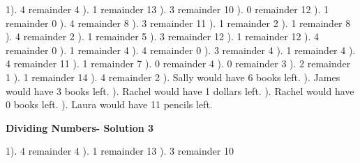 \documentclass{article}%
\begin{document}
1). 4 remainder 4%
). 1 remainder 13%
). 3 remainder 10%
). 0 remainder 12%
). 1 remainder 0%
). 4 remainder 8%
). 3 remainder 11%
). 1 remainder 2%
). 1 remainder 8%
). 4 remainder 2%
). 1 remainder 5%
). 3 remainder 12%
). 1 remainder 12%
). 4 remainder 0%
). 1 remainder 4%
). 4 remainder 0%
). 3 remainder 4%
). 1 remainder 4%
). 4 remainder 11%
). 1 remainder 7%
). 0 remainder 4%
). 0 remainder 3%
). 2 remainder 1%
). 1 remainder 14%
). 4 remainder 2%
). Sally would have 6 books left.%
). James would have 3 books left.%
). Rachel would have 1 dollars left.%
). Rachel would have 0 books left.%
). Laura would have 11 pencils left.%
\newline%
\newpage%
\large%
\begin{center}%
\textbf{Dividing Numbers- Solution 3}%
\newline%
\end{center} \normalsize%
1). 4 remainder 4%
). 1 remainder 13%
). 3 remainder 10%
\newline%
\end{document}
